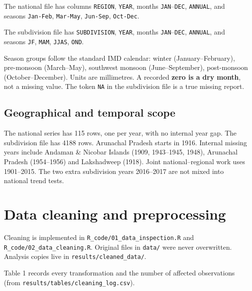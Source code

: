 \documentclass[
]{article}
\begin{document}
The national file has columns \texttt{REGION}, \texttt{YEAR}, months
\texttt{JAN}--\texttt{DEC}, \texttt{ANNUAL}, and seasons
\texttt{Jan-Feb}, \texttt{Mar-May}, \texttt{Jun-Sep}, \texttt{Oct-Dec}.

The subdivision file has \texttt{SUBDIVISION}, \texttt{YEAR}, months
\texttt{JAN}--\texttt{DEC}, \texttt{ANNUAL}, and seasons \texttt{JF},
\texttt{MAM}, \texttt{JJAS}, \texttt{OND}.

Season groups follow the standard IMD calendar: winter
(January--February), pre-monsoon (March--May), southwest monsoon
(June--September), post-monsoon (October--December). Units are
millimetres. A recorded \textbf{zero is a dry month}, not a missing
value. The token \texttt{NA} in the subdivision file is a true missing
report.

\subsection{Geographical and temporal
scope}\label{geographical-and-temporal-scope}

The national series has 115 rows, one per year, with no internal year
gap. The subdivision file has 4188 rows. Arunachal Pradesh starts in
1916. Internal missing years include Andaman \& Nicobar Islands (1909,
1943--1945, 1948), Arunachal Pradesh (1954--1956) and Lakshadweep
(1918). Joint national--regional work uses 1901--2015. The two extra
subdivision years 2016--2017 are not mixed into national trend tests.

\section{Data cleaning and
preprocessing}\label{data-cleaning-and-preprocessing}

Cleaning is implemented in \texttt{R\_code/01\_data\_inspection.R} and
\texttt{R\_code/02\_data\_cleaning.R}. Original files in \texttt{data/}
were never overwritten. Analysis copies live in
\texttt{results/cleaned\_data/}.

Table 1 records every transformation and the number of affected
observations (from \texttt{results/tables/cleaning\_log.csv}).
\end{document}
